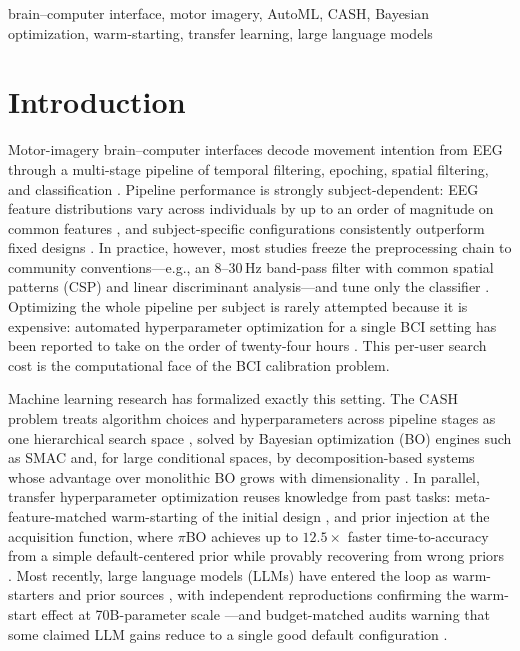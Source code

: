 \documentclass[conference]{IEEEtran}
\begin{document}
\begin{IEEEkeywords}
brain--computer interface, motor imagery, AutoML, CASH, Bayesian optimization, warm-starting, transfer learning, large language models
\end{IEEEkeywords}

\section{Introduction}
\label{sec:intro}

Motor-imagery brain--computer interfaces decode movement intention from EEG through a multi-stage pipeline of temporal filtering, epoching, spatial filtering, and classification \cite{CraikEtAl2019, SchirrmeisterEtAl2017}. Pipeline performance is strongly subject-dependent: EEG feature distributions vary across individuals by up to an order of magnitude on common features \cite{ZhangEtAl2024}, and subject-specific configurations consistently outperform fixed designs \cite{AnarakiEtAl2024, WangEtAl2026}. In practice, however, most studies freeze the preprocessing chain to community conventions---e.g., an 8--30\,Hz band-pass filter with common spatial patterns (CSP) and linear discriminant analysis---and tune only the classifier \cite{CraikEtAl2019, LeonEtAl2020}. Optimizing the whole pipeline per subject is rarely attempted because it is expensive: automated hyperparameter optimization for a single BCI setting has been reported to take on the order of twenty-four hours \cite{BerdyshevEtAl2024}. This per-user search cost is the computational face of the BCI calibration problem.

Machine learning research has formalized exactly this setting. The CASH problem treats algorithm choices and hyperparameters across pipeline stages as one hierarchical search space \cite{KotthoffEtAl2019, HutterEtAl2019}, solved by Bayesian optimization (BO) engines such as SMAC \cite{LindauerEtAl2021} and, for large conditional spaces, by decomposition-based systems whose advantage over monolithic BO grows with dimensionality \cite{LiEtAl2021b, LiEtAl2020a}. In parallel, transfer hyperparameter optimization reuses knowledge from past tasks: meta-feature-matched warm-starting of the initial design \cite{FeurerEtAl2015}, and prior injection at the acquisition function, where $\pi$BO achieves up to $12.5\times$ faster time-to-accuracy from a simple default-centered prior while provably recovering from wrong priors \cite{HvarfnerEtAl2022}. Most recently, large language models (LLMs) have entered the loop as warm-starters and prior sources \cite{LiuEtAl2024, XuEtAl2026a}, with independent reproductions confirming the warm-start effect at 70B-parameter scale \cite{RychertEtAl2025}---and budget-matched audits warning that some claimed LLM gains reduce to a single good default configuration \cite{RodriguesEtAl2026}.
\end{document}
